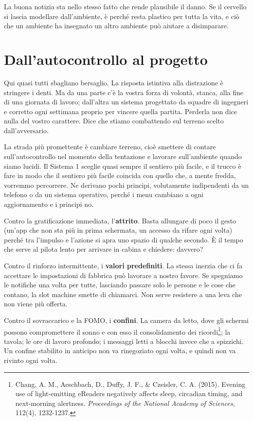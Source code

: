 La buona notizia sta nello stesso fatto che rende plausibile il danno. Se il cervello si lascia modellare dall'ambiente, è perché resta plastico per tutta la vita, e ciò che un ambiente ha insegnato un altro ambiente può aiutare a disimparare.

\section{Dall'autocontrollo al progetto}

Qui quasi tutti sbagliano bersaglio. La risposta istintiva alla distrazione è stringere i denti. Ma da una parte c'è la vostra forza di volontà, stanca, alla fine di una giornata di lavoro; dall'altra un sistema progettato da squadre di ingegneri e corretto ogni settimana proprio per vincere quella partita. Perderla non dice nulla del vostro carattere. Dice che stiamo combattendo sul terreno scelto dall'avversario.

La strada più promettente è cambiare terreno, cioè smettere di contare sull'autocontrollo nel momento della tentazione e lavorare sull'ambiente quando siamo lucidi. Il Sistema 1 sceglie quasi sempre il sentiero più facile, e il trucco è fare in modo che il sentiero più facile coincida con quello che, a mente fredda, vorremmo percorrere. Ne derivano pochi principi, volutamente indipendenti da un telefono o da un sistema operativo, perché i menu cambiano a ogni aggiornamento e i principi no.

Contro la gratificazione immediata, l'\textbf{attrito}. Basta allungare di poco il gesto (un'app che non sta più in prima schermata, un accesso da rifare ogni volta) perché tra l'impulso e l'azione si apra uno spazio di qualche secondo. È il tempo che serve al pilota lento per arrivare in cabina e chiedere: davvero?

Contro il rinforzo intermittente, i \textbf{valori predefiniti}. La stessa inerzia che ci fa accettare le impostazioni di fabbrica può lavorare a nostro favore. Se spegniamo le notifiche una volta per tutte, lasciando passare solo le persone e le cose che contano, la slot machine smette di chiamarci. Non serve resistere a una leva che non viene più offerta.

Contro il sovraccarico e la FOMO, i \textbf{confini}. La camera da letto, dove gli schermi possono compromettere il sonno e con esso il consolidamento dei ricordi\footnote{Chang, A. M., Aeschbach, D., Duffy, J. F., \& Czeisler, C. A. (2015). Evening use of light-emitting eReaders negatively affects sleep, circadian timing, and next-morning alertness. \textit{Proceedings of the National Academy of Sciences}, 112(4), 1232-1237.}; la tavola; le ore di lavoro profondo; i messaggi letti a blocchi invece che a spizzichi. Un confine stabilito in anticipo non va rinegoziato ogni volta, e quindi non va rivinto ogni volta.

